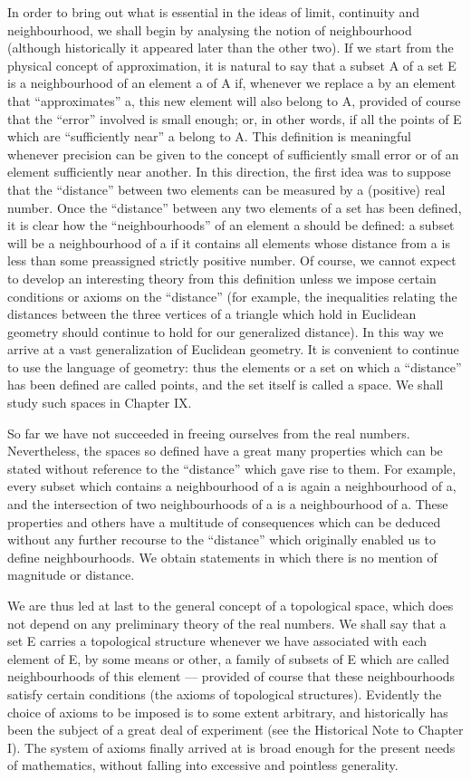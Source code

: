 In order to bring out what is essential in the ideas of limit, continuity and neighbourhood, we shall begin by analysing the notion of neighbourhood (although historically it appeared later than the other two). If we start from the physical concept of approximation, it is natural to say that a subset A of a set E is a neighbourhood of an element a of A if, whenever we replace a by an element that ``approximates'' a, this new element will also belong to A, provided of course that the ``error'' involved is small enough; or, in other words, if all the points of E which are ``sufficiently near'' a belong to A. This definition is meaningful whenever precision can be given to the concept of sufficiently small error or of an element sufficiently near another. In this direction, the first idea was to suppose that the ``distance'' between two elements can be measured by a (positive) real number. Once the ``distance'' between any two elements of a set has been defined, it is clear how the ``neighbourhoods'' of an element a should be defined: a subset will be a neighbourhood of a if it contains all elements whose distance from a is less than some preassigned strictly positive number. Of course, we cannot expect to develop an interesting theory from this definition unless we impose certain conditions or axioms on the ``distance'' (for example, the inequalities relating the distances between the three vertices of a triangle which hold in Euclidean geometry should continue to hold for our generalized distance). In this way we arrive at a vast generalization of Euclidean geometry. It is convenient to continue to use the language of geometry: thus the elements or a set on which a ``distance'' has been defined are called points, and the set itself is called a space. We shall study such spaces in Chapter IX.

So far we have not succeeded in freeing ourselves from the real numbers. Nevertheless, the spaces so defined have a great many properties which can be stated without reference to the ``distance'' which gave rise to them. For example, every subset which contains a neighbourhood of a is again a neighbourhood of a, and the intersection of two neighbourhoods of a is a neighbourhood of a. These properties and others have a multitude of consequences which can be deduced without any further recourse to the ``distance'' which originally enabled us to define neighbourhoods. We obtain statements in which there is no mention of magnitude or distance.

We are thus led at last to the general concept of a topological space, which does not depend on any preliminary theory of the real numbers. We shall say that a set E carries a topological structure whenever we have associated with each element of E, by some means or other, a family of subsets of E which are called neighbourhoods of this element --- provided of course that these neighbourhoods satisfy certain conditions (the axioms of topological structures). Evidently the choice of axioms to be imposed is to some extent arbitrary, and historically has been the subject of a great deal of experiment (see the Historical Note to Chapter I). The system of axioms finally arrived at is broad enough for the present needs of mathematics, without falling into excessive and pointless generality.


